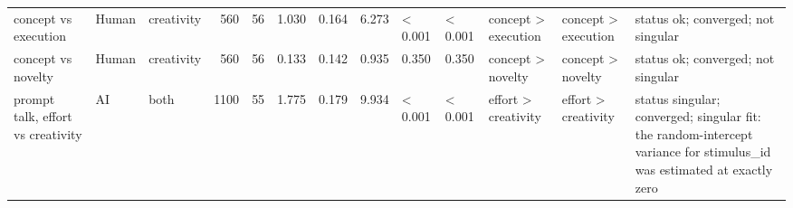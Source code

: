 \begin{table}[!h]
{\begin{tabular}[t]{lllrrrrrlllll}
concept vs execution & Human & creativity & 560 & 56 & 1.030 & 0.164 & 6.273 & < 0.001 & < 0.001 & concept > execution & concept > execution & status ok; converged; not singular\\
concept vs novelty & Human & creativity & 560 & 56 & 0.133 & 0.142 & 0.935 & 0.350 & 0.350 & concept > novelty & concept > novelty & status ok; converged; not singular\\
prompt talk, effort vs creativity & AI & both & 1100 & 55 & 1.775 & 0.179 & 9.934 & < 0.001 & < 0.001 & effort > creativity & effort > creativity & status singular; converged; singular fit: the random-intercept variance for stimulus\_id was estimated at exactly zero\\
\bottomrule
\end{tabular}}
\end{table}